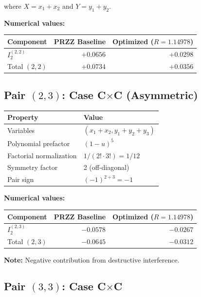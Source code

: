 \documentclass[11pt]{article}
\begin{document}
where $X = x_1+x_2$ and $Y = y_1+y_2$.

\textbf{Numerical values:}

\begin{center}
\begin{tabular}{lrr}
\toprule
Component & PRZZ Baseline & Optimized ($R=1.14978$) \\
\midrule
$I_2^{(2,2)}$ & $+0.0656$ & $+0.0298$ \\
Total $(2,2)$ & $+0.0734$ & $+0.0356$ \\
\bottomrule
\end{tabular}
\end{center}

\subsection{Pair $(2,3)$: Case C$\times$C (Asymmetric)}

\begin{center}
\begin{tabular}{ll}
\toprule
Property & Value \\
\midrule
Variables & $(x_1+x_2, y_1+y_2+y_3)$ \\
Polynomial prefactor & $(1-u)^5$ \\
Factorial normalization & $1/(2! \cdot 3!) = 1/12$ \\
Symmetry factor & 2 (off-diagonal) \\
Pair sign & $(-1)^{2+3} = -1$ \\
\bottomrule
\end{tabular}
\end{center}

\textbf{Numerical values:}

\begin{center}
\begin{tabular}{lrr}
\toprule
Component & PRZZ Baseline & Optimized ($R=1.14978$) \\
\midrule
$I_2^{(2,3)}$ & $-0.0578$ & $-0.0267$ \\
Total $(2,3)$ & $-0.0645$ & $-0.0312$ \\
\bottomrule
\end{tabular}
\end{center}

\textbf{Note:} Negative contribution from destructive interference.

\subsection{Pair $(3,3)$: Case C$\times$C}
\end{document}
